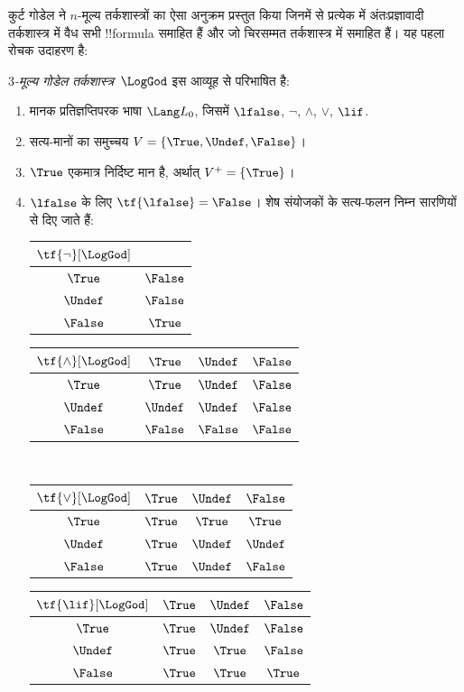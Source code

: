 \documentclass[../../../include/open-logic-section]{subfiles}
\begin{document}


कुर्ट गोडेल ने $n$-मूल्य तर्कशास्त्रों का ऐसा अनुक्रम प्रस्तुत किया जिनमें
से प्रत्येक में अंतःप्रज्ञावादी तर्कशास्त्र में वैध सभी !!{formula}
समाहित हैं और जो चिरसम्मत तर्कशास्त्र में समाहित हैं। यह पहला रोचक उदाहरण
है:

\begin{defn}
\emph{$3$-मूल्य गोडेल तर्कशास्त्र}~$\LogGod$ इस आव्यूह से परिभाषित है:
\begin{enumerate}
  \item मानक प्रतिज्ञप्तिपरक भाषा $\Lang L_0$, जिसमें
  $\lfalse$, $\lnot$, $\land$, $\lor$, $\lif$.
  \item सत्य-मानों का समुच्चय $V = \{\True, \Undef, \False\}$।
  \item $\True$ एकमात्र निर्दिष्ट मान है, अर्थात् $V^+ = \{\True\}$।
  \item $\lfalse$ के लिए $\tf{\lfalse} = \False$। शेष संयोजकों के
  सत्य-फलन निम्न सारणियों से दिए जाते हैं:
  \begin{center}
    \begin{tabular}{c|c} 
      $\tf{\lnot}[\LogGod]$ & \\ 
      \hline  
      $\True$ & $\False$ \\ 
      $\Undef$ & $\False$ \\
      $\False$ & $\True$ 
    \end{tabular}
    \quad
    \begin{tabular}{c|ccc} 
      $\tf{\land}[\LogGod]$ & $\True$ & $\Undef$ & $\False$ \\ 
      \hline 
      $\True$ & $\True$ & $\Undef$ & $\False$ \\ 
      $\Undef$ & $\Undef$ & $\Undef$ & $\False$\\ 
      $\False$ & $\False$ & $\False$ & $\False$ 
    \end{tabular}
    \\[2ex]
    \begin{tabular}{c|ccc} 
      $\tf{\lor}[\LogGod]$ & $\True$ & $\Undef$ & $\False$ \\ 
      \hline 
      $\True$ & $\True$ & $\True$ & $\True$ \\ 
      $\Undef$ & $\True$ & $\Undef$ & $\Undef$ \\
      $\False$ & $\True$ & $\Undef$ & $\False$ 
    \end{tabular}
    \quad
    \begin{tabular}{c|ccc} 
      $\tf{\lif}[\LogGod]$ & $\True$ & $\Undef$ & $\False$ \\ 
      \hline 
      $\True$ & $\True$ & $\Undef$ & $\False$ \\ 
      $\Undef$ & $\True$ & $\True$ & $\False$  \\ 
      $\False$ & $\True$ & $\True$ & $\True$ 
    \end{tabular}
  \end{center} 
\end{enumerate}
\end{defn}
\end{document}
